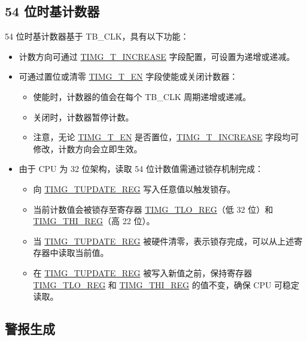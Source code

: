 \documentclass[main\_\_CN.tex]{subfiles}
\begin{document}
\subsection{54 位时基计数器}

54 位时基计数器基于 TB\_CLK，具有以下功能：

\begin{itemize}
    \item 计数方向可通过 \hyperref[fielddesc:TIMGTXINCREASE]{TIMG\_T\_INCREASE} 字段配置，可设置为递增或递减。
    \item 可通过置位或清零 \hyperref[fielddesc:TIMGTXEN]{TIMG\_T\_EN} 字段使能或关闭计数器：
    \begin{itemize}
        \item 使能时，计数器的值会在每个 TB\_CLK 周期递增或递减。
        \item 关闭时，计数器暂停计数。
        \item 注意，无论 \hyperref[fielddesc:TIMGTXEN]{TIMG\_T\_EN} 是否置位，\hyperref[fielddesc:TIMGTXINCREASE]{TIMG\_T\_INCREASE} 字段均可修改，计数方向会立即生效。
    \end{itemize}

    \item 由于 CPU 为 32 位架构，读取 54 位计数值需通过锁存机制完成：
    \begin{itemize}
    \item 向 \hyperref[regdesc:TIMGTXUPDATEREG]{TIMG\_TUPDATE\_REG} 写入任意值以触发锁存。
    \item 当前计数值会被锁存至寄存器 \hyperref[regdesc:TIMGTXLOREG]{TIMG\_TLO\_REG}（低 32 位）和 \hyperref[regdesc:TIMGTXHIREG]{TIMG\_THI\_REG}（高 22 位）。
    \item 当 \hyperref[regdesc:TIMGTXUPDATEREG]{TIMG\_TUPDATE\_REG} 被硬件清零，表示锁存完成，可以从上述寄存器中读取当前值。
    \item 在 \hyperref[regdesc:TIMGTXUPDATEREG]{TIMG\_TUPDATE\_REG} 被写入新值之前，保持寄存器 \hyperref[regdesc:TIMGTXLOREG]{TIMG\_TLO\_REG} 和 \hyperref[regdesc:TIMGTXHIREG]{TIMG\_THI\_REG} 的值不变，确保 CPU 可稳定读取。
    \end{itemize}
\end{itemize}


\subsection{警报生成}
\end{document}
